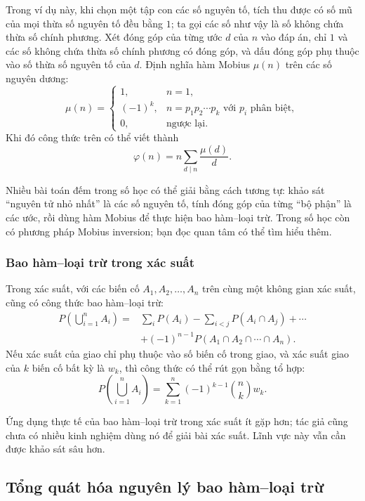 \documentclass[11pt]{article}
\begin{document}
Trong ví dụ này, khi chọn một tập con các số nguyên tố, tích thu được có số mũ
của mọi thừa số nguyên tố đều bằng \(1\); ta gọi các số như vậy là số không
chứa thừa số chính phương. Xét đóng góp của từng ước \(d\) của \(n\) vào đáp
án, chỉ \(1\) và các số không chứa thừa số chính phương có đóng góp, và dấu
đóng góp phụ thuộc vào số thừa số nguyên tố của \(d\). Định nghĩa hàm
Mobius \(\mu(n)\) trên các số nguyên dương:
\[
\mu(n)=
\begin{cases}
1, & n=1,\\
(-1)^k, & n=p_1p_2\cdots p_k\text{ với }p_i\text{ phân biệt},\\
0, & \text{ngược lại}.
\end{cases}
\]
Khi đó công thức trên có thể viết thành
\[
  \varphi(n)=n\sum_{d\mid n}\frac{\mu(d)}{d}.
\]

Nhiều bài toán đếm trong số học có thể giải bằng cách tương tự: khảo sát
``nguyên tử nhỏ nhất'' là các số nguyên tố, tính đóng góp của từng ``bộ phận''
là các ước, rồi dùng hàm Mobius để thực hiện bao hàm--loại trừ. Trong số học
còn có phương pháp Mobius inversion; bạn đọc quan tâm có thể tìm hiểu thêm.

\subsubsection{Bao hàm--loại trừ trong xác suất}

Trong xác suất, với các biến cố \(A_1,A_2,\ldots,A_n\) trên cùng một không
gian xác suất, cũng có công thức bao hàm--loại trừ:
\[
\begin{aligned}
P\left(\bigcup_{i=1}^n A_i\right)
={}&\sum_i P(A_i)-\sum_{i<j}P(A_i\cap A_j)+\cdots\\
&+(-1)^{n-1}P(A_1\cap A_2\cap\cdots\cap A_n).
\end{aligned}
\]
Nếu xác suất của giao chỉ phụ thuộc vào số biến cố trong giao, và xác suất
giao của \(k\) biến cố bất kỳ là \(w_k\), thì công thức có thể rút gọn bằng
tổ hợp:
\[
  P\left(\bigcup_{i=1}^n A_i\right)
  = \sum_{k=1}^n (-1)^{k-1}\binom nk w_k.
\]

Ứng dụng thực tế của bao hàm--loại trừ trong xác suất ít gặp hơn; tác giả cũng
chưa có nhiều kinh nghiệm dùng nó để giải bài xác suất. Lĩnh vực này vẫn cần
được khảo sát sâu hơn.

\subsection{Tổng quát hóa nguyên lý bao hàm--loại trừ}
\end{document}
